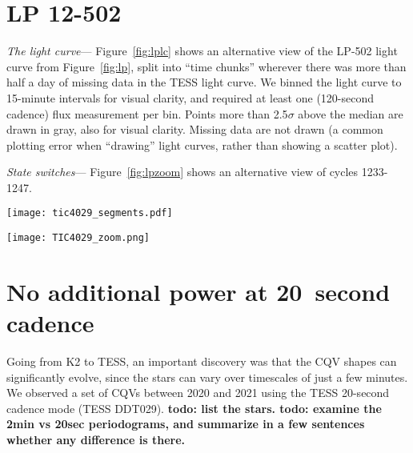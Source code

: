 \documentclass[11pt,twocolumn,tighten]{aastex63}
\begin{document}
\section{LP 12-502}

{\it The light curve}---
Figure~\ref{fig:lplc} shows an alternative view of the LP-502 light
curve from Figure~\ref{fig:lp}, 
split into ``time chunks'' wherever there was more than half a day of
missing data in the TESS light curve.
We binned the light curve to 15-minute intervals for visual clarity,
and required at least one (120-second cadence) flux measurement per
bin.
Points more than 2.5$\sigma$ above the median are drawn in gray, also
for visual clarity.
Missing data are not drawn (a common plotting error when ``drawing''
light curves, rather than showing a scatter plot).

{\it State switches}---
Figure~\ref{fig:lpzoom} shows an alternative view of cycles 1233-1247.

\begin{figure*}[!t]
	\begin{center}
		\centering
		\texttt{[image: tic4029\_segments.pdf]}
		\vspace{-0.2cm}
		\caption{
			LP 12-502 light curve, split into time chunks.
		}
		\label{fig:lplc}
	\end{center}
\end{figure*}

\begin{figure*}[!t]
	\begin{center}
		\centering
		\texttt{[image: TIC4029\_zoom.png]}
		\vspace{-0.45cm}
		\caption{
			LP 12-502 cycles 1233-1247, showing the most dramatic state
      change observed over the three year baseline.
		}
		\label{fig:lpzoom}
	\end{center}
\end{figure*}


\section{No additional power at 20~second cadence}

Going from K2 to TESS, an important discovery was that the CQV shapes
can significantly evolve, since the stars can vary over timescales of just a few minutes.
We observed a set of CQVs between 2020 and 2021 using the TESS 20-second
cadence mode (TESS DDT029).
{\bf todo: list the stars.  todo: examine the 2min vs 20sec periodograms, and summarize in a few
sentences whether any difference is there.}






\clearpage
\listofchanges
\end{document}
